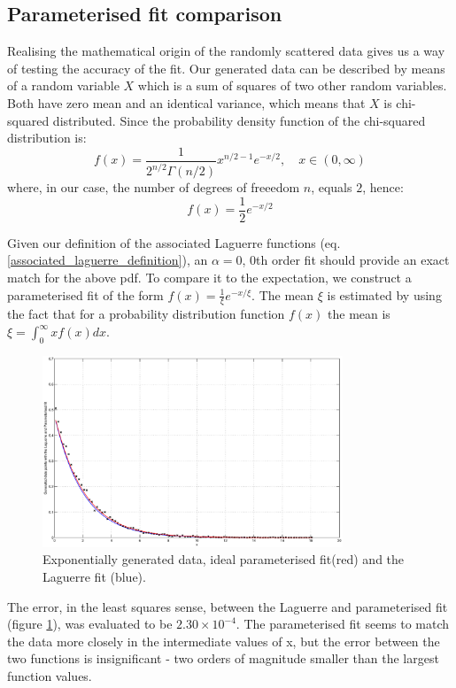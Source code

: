 \documentclass[a4paper]{article}
\numberwithin{equation}{section}
\begin{document}
\subsection{Parameterised fit comparison}
Realising the mathematical origin of the randomly scattered data gives us a way of testing the accuracy of the fit. Our generated data can be described by means of a random variable $X$ which is a sum of squares of two other random variables. Both have zero mean and an identical variance, which means that $X$ is chi-squared distributed. Since the probability density function of the chi-squared distribution is:
\begin{equation}
f(x) = \frac{1}{2^{n/2} \Gamma(n/2)}x^{n/2-1} e^{-x/2}, \quad x \in (0, \infty)
\end{equation}
where, in our case, the number of degrees of freeedom $n$, equals $2$, hence:
\begin{equation}
f(x) = \frac{1}{2} e^{-x/2}
\end{equation}

\noindent Given our definition of the associated Laguerre functions (eq. \ref{associated_laguerre_definition}), an $\alpha = 0$, 0th order fit should provide an exact match for the above pdf. To compare it to the expectation, we construct a parameterised fit of the form $f(x) = \frac{1}{\xi} e^{-x/\xi}$. The mean $\xi$ is estimated by using the fact that for a probability distribution function $f(x)$ the mean is $\xi = \int_{0}^{\infty} xf(x) dx$.

\begin{figure}[!h]
\centering
\includegraphics[width=0.8\textwidth]{laguerre_parameterised_fit.eps}
\caption{\label{fig:laguerreparemeterisedfit}Exponentially generated data, ideal parameterised fit(red) and the Laguerre fit (blue).}
\end{figure}

\noindent The error, in the least squares sense, between the Laguerre and parameterised fit (figure \ref{fig:laguerreparemeterisedfit}), was evaluated to be $2.30 \times 10^{-4}$. The parameterised fit seems to match the data more closely in the intermediate values of x, but the error between the two functions is insignificant - two orders of magnitude smaller than the largest function values.
\end{document}
